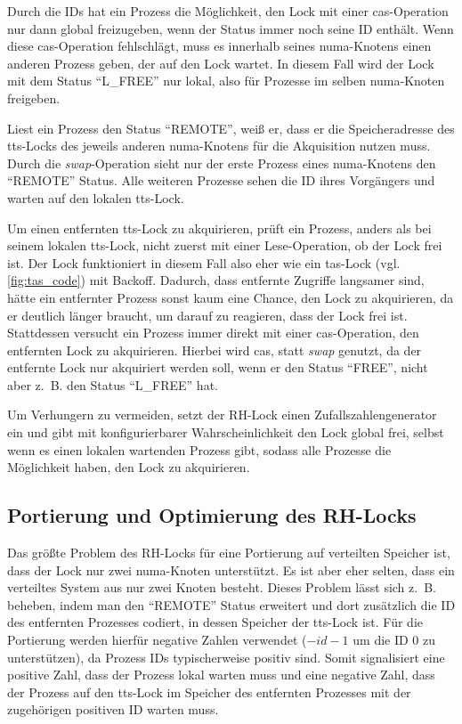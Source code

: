 Durch die IDs hat ein Prozess die Möglichkeit,
den Lock mit einer \gls{cas}-Operation nur dann global freizugeben,
wenn der Status immer noch seine ID enthält.
Wenn diese \gls{cas}-Operation fehlschlägt,
muss es innerhalb seines \gls{numa}-Knotens einen anderen Prozess geben,
der auf den Lock wartet.
In diesem Fall wird der Lock mit dem Status \enquote{L\_FREE} nur lokal,
also für Prozesse im selben \gls{numa}-Knoten freigeben.

Liest ein Prozess den Status \enquote{REMOTE},
weiß er,
dass er die Speicheradresse des \gls{tts}-Locks
des jeweils anderen \gls{numa}-Knotens
für die Akquisition
nutzen muss.
Durch die \textit{swap}-Operation
sieht nur der erste Prozess eines \gls{numa}-Knotens den \enquote{REMOTE} Status.
Alle weiteren Prozesse sehen die ID ihres Vorgängers
und warten auf den lokalen \gls{tts}-Lock.

Um einen entfernten \gls{tts}-Lock zu akquirieren,
prüft ein Prozess,
anders als bei seinem lokalen \gls{tts}-Lock,
nicht zuerst mit einer Lese-Operation,
ob der Lock frei ist.
Der Lock funktioniert in diesem Fall also eher wie ein \gls{tas}-Lock (vgl. \autoref{fig:tas_code}) mit Backoff.
Dadurch,
dass entfernte Zugriffe langsamer sind,
hätte ein entfernter Prozess sonst kaum eine Chance,
den Lock zu akquirieren,
da er deutlich länger braucht,
um darauf zu reagieren,
dass der Lock frei ist.
Stattdessen versucht ein Prozess immer direkt mit einer \gls{cas}-Operation,
den entfernten Lock zu akquirieren.
Hierbei wird \gls{cas},
statt \textit{swap} genutzt,
da der entfernte Lock nur akquiriert werden soll,
wenn er den Status \enquote{FREE},
nicht aber z.~B. den Status \enquote{L\_FREE} hat.

Um \gls{Verhungern} zu vermeiden,
setzt der RH-Lock einen Zufallszahlengenerator ein
und gibt mit konfigurierbarer Wahrscheinlichkeit den Lock global frei,
selbst wenn es einen lokalen wartenden Prozess gibt,
sodass alle Prozesse die Möglichkeit haben,
den Lock zu akquirieren.

\clearpage

\subsection{Portierung und Optimierung des RH-Locks}

Das größte Problem des RH-Locks für eine Portierung auf verteilten Speicher ist,
dass der Lock nur zwei \gls{numa}-Knoten unterstützt.
Es ist aber eher selten,
dass ein verteiltes System aus nur zwei Knoten besteht.
Dieses Problem lässt sich z.~B. beheben,
indem man den \enquote{REMOTE} Status erweitert
und dort zusätzlich die ID des entfernten Prozesses codiert,
in dessen Speicher der \gls{tts}-Lock ist.
Für die Portierung werden hierfür negative Zahlen verwendet ($-id - 1$ um die ID 0 zu unterstützen),
da Prozess IDs typischerweise positiv sind.
Somit signalisiert eine positive Zahl,
dass der Prozess lokal warten muss
und eine negative Zahl,
dass der Prozess auf den \gls{tts}-Lock
im Speicher des entfernten Prozesses mit der zugehörigen positiven ID warten muss.

